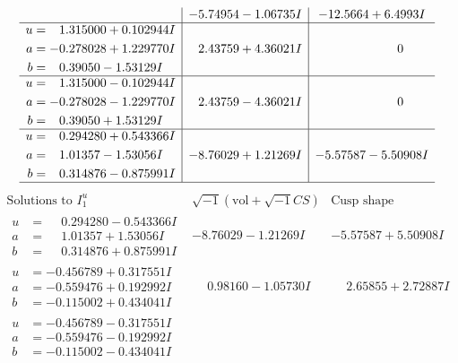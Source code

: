 \documentclass[1p]{elsarticle_modified}
\theoremstyle{definition}
\newcommand{\I}{\sqrt{-1}}
\begin{document}
$$\begin{array}{c|c|c}
 & -5.74954 - 1.06735 I & -12.5664 + 6.4993 I \\ \hline\begin{aligned}
u &= \phantom{-}1.315000 + 0.102944 I \\
a &= -0.278028 + 1.229770 I \\
b &= \phantom{-}0.39050 - 1.53129 I\end{aligned}
 & \phantom{-}2.43759 + 4.36021 I & \phantom{-0.000000 } 0 \\ \hline\begin{aligned}
u &= \phantom{-}1.315000 - 0.102944 I \\
a &= -0.278028 - 1.229770 I \\
b &= \phantom{-}0.39050 + 1.53129 I\end{aligned}
 & \phantom{-}2.43759 - 4.36021 I & \phantom{-0.000000 } 0 \\ \hline\begin{aligned}
u &= \phantom{-}0.294280 + 0.543366 I \\
a &= \phantom{-}1.01357 - 1.53056 I \\
b &= \phantom{-}0.314876 - 0.875991 I\end{aligned}
 & -8.76029 + 1.21269 I & -5.57587 - 5.50908 I\\
 \hline 
 \end{array}$$\newpage$$\begin{array}{c|c|c}  
\text{Solutions to }I^u_{1}& \I (\text{vol} + \sqrt{-1}CS) & \text{Cusp shape}\\
 \hline 
\begin{aligned}
u &= \phantom{-}0.294280 - 0.543366 I \\
a &= \phantom{-}1.01357 + 1.53056 I \\
b &= \phantom{-}0.314876 + 0.875991 I\end{aligned}
 & -8.76029 - 1.21269 I & -5.57587 + 5.50908 I \\ \hline\begin{aligned}
u &= -0.456789 + 0.317551 I \\
a &= -0.559476 + 0.192992 I \\
b &= -0.115002 + 0.434041 I\end{aligned}
 & \phantom{-}0.98160 - 1.05730 I & \phantom{-}2.65855 + 2.72887 I \\ \hline\begin{aligned}
u &= -0.456789 - 0.317551 I \\
a &= -0.559476 - 0.192992 I \\
b &= -0.115002 - 0.434041 I\end{aligned}

\end{array}$$
\end{document}

